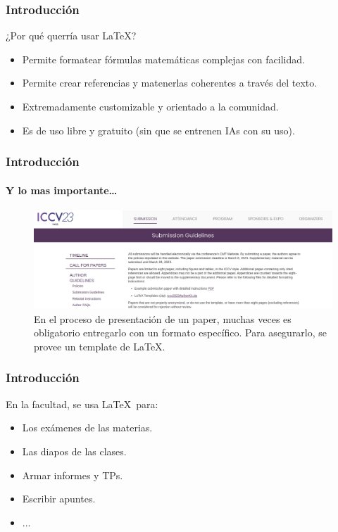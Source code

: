 \begin{frame}
    \frametitle{Introducción}
    \begin{tcolorbox}[colframe=color1]
        \begin{center}
            ¿Por qué querría usar \LaTeX ?
        \end{center}
    \end{tcolorbox}

    \begin{itemize}
        \item Permite formatear fórmulas matemáticas complejas con facilidad.
        \item Permite crear referencias y matenerlas coherentes a través del texto.
        \item Extremadamente customizable y orientado a la comunidad.
        \item Es de uso libre y gratuito (sin que se entrenen IAs con su uso).
    \end{itemize}
\end{frame}

\begin{frame}
    \frametitle{Introducción}
    \framesubtitle{Y lo mas importante\dots}
    \begin{figure}[h]
        \centering
        \includegraphics[width=\textwidth]{../images/submission.png}
        \caption{En el proceso de presentación de un paper, muchas veces es obligatorio entregarlo con un formato específico. Para asegurarlo, se provee un template de \LaTeX.}
    \end{figure}
\end{frame}

\begin{frame}
\frametitle{Introducción}
    En la facultad, se usa \LaTeX\ para:
    \begin{itemize}
    \item Los exámenes de las materias.
    \item Las diapos de las clases.
    \item Armar informes y TPs.
    \item Escribir apuntes.
    \item ...
    \end{itemize}
\end{frame}
